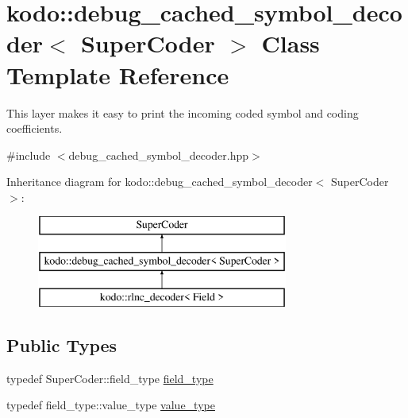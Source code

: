 \hypertarget{classkodo_1_1debug__cached__symbol__decoder}{\section{kodo\-:\-:debug\-\_\-cached\-\_\-symbol\-\_\-decoder$<$ Super\-Coder $>$ Class Template Reference}
\label{classkodo_1_1debug__cached__symbol__decoder}
}


This layer makes it easy to print the incoming coded symbol and coding coefficients.  




{\ttfamily \#include $<$debug\-\_\-cached\-\_\-symbol\-\_\-decoder.\-hpp$>$}

Inheritance diagram for kodo\-:\-:debug\-\_\-cached\-\_\-symbol\-\_\-decoder$<$ Super\-Coder $>$\-:\begin{figure}[H]
\begin{center}
\leavevmode
\includegraphics[height=3.000000cm]{classkodo_1_1debug__cached__symbol__decoder}
\end{center}
\end{figure}
\subsection*{Public Types}
\begin{DoxyCompactItemize}
\item 
typedef Super\-Coder\-::field\-\_\-type \hyperlink{classkodo_1_1debug__cached__symbol__decoder_aa3d3e96340faae6d4d4f09d5cddea6ff}{field\-\_\-type}
\begin{DoxyCompactList}\small\item\em \end{DoxyCompactList}\item 
typedef field\-\_\-type\-::value\-\_\-type \hyperlink{classkodo_1_1debug__cached__symbol__decoder_ab5575893daee52bc132f9853ff3e229f}{value\-\_\-type}
\begin{DoxyCompactList}\small\item\em \end{DoxyCompactList}\end{DoxyCompactItemize}
